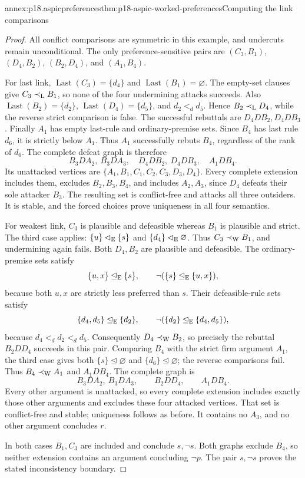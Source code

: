 \begin{annexitem}{annex:p18.aspicpreferences}{thm:p18-aspic-worked-preferences}{Computing the link comparisons}
\begin{proof}
All conflict comparisons are symmetric in this example, and undercuts
remain unconditional. The only preference-sensitive pairs are
\((C_3,B_1)\), \((D_4,B_2)\), \((B_2,D_4)\), and \((A_1,B_4)\).

For last link,
\(\operatorname{Last}(C_3)=\{d_4\}\) and
\(\operatorname{Last}(B_1)=\varnothing\).
The empty-set clauses give \(C_3\prec_{\rm L}B_1\), so none of the
four undermining attacks succeeds.
Also \(\operatorname{Last}(B_2)=\{d_2\}\),
\(\operatorname{Last}(D_4)=\{d_5\}\), and \(d_2<_d d_5\).
Hence \(B_2\prec_{\rm L}D_4\), while the reverse strict comparison
is false. The successful rebuttals are \(D_4 D B_2,D_4 D B_3\).
Finally \(A_1\) has empty last-rule and ordinary-premise sets.
Since \(B_4\) has last rule \(d_6\), it is strictly below \(A_1\).
Thus \(A_1\) successfully rebuts \(B_4\), regardless of the rank of \(d_6\).
The complete defeat graph is therefore
\[
 B_3D A_2,\ B_3D A_3,\quad
 D_4D B_2,\ D_4D B_3,\quad A_1D B_4 .
\]
Its unattacked vertices are
\(\{A_1,B_1,C_1,C_2,C_3,D_3,D_4\}\).
Every complete extension includes them, excludes \(B_2,B_3,B_4\),
and includes \(A_2,A_3\), since \(D_4\) defeats their sole attacker
\(B_3\). The resulting set is conflict-free and attacks all three
outsiders. It is stable, and the forced choices prove uniqueness in all
four semantics.

For weakest link, \(C_3\) is plausible and defeasible whereas \(B_1\)
is plausible and strict. The third case applies:
\(\{u\}\lhd_{\rm E}\{s\}\) and
\(\{d_4\}\lhd_{\rm E}\varnothing\).
Thus \(C_3\prec_{\rm W}B_1\), and undermining again fails.
Both \(D_4,B_2\) are plausible and defeasible.
The ordinary-premise sets satisfy
\[
 \{u,x\}\unlhd_{\rm E}\{s\},\qquad
 \neg(\{s\}\unlhd_{\rm E}\{u,x\}),
\]
because both \(u,x\) are strictly less preferred than \(s\).
Their defeasible-rule sets satisfy
\[
 \{d_4,d_5\}\unlhd_{\rm E}\{d_2\},\qquad
 \neg(\{d_2\}\unlhd_{\rm E}\{d_4,d_5\}),
\]
because \(d_4<_d d_2<_d d_5\).
Consequently \(D_4\prec_{\rm W}B_2\), so precisely the rebuttal
\(B_2 D D_4\) succeeds in this pair.
Comparing \(B_4\) with the strict firm argument \(A_1\), the third
case gives both \(\{s\}\unlhd\varnothing\) and
\(\{d_6\}\unlhd\varnothing\); the reverse comparisons fail.
Thus \(B_4\prec_{\rm W}A_1\) and \(A_1 D B_4\).
The complete graph is
\[
 B_3D A_2,\ B_3D A_3,\qquad B_2D D_4,\qquad A_1D B_4 .
\]
Every other argument is unattacked, so every complete extension includes
exactly those other arguments and excludes these four attacked vertices.
That set is conflict-free and stable; uniqueness follows as before.
It contains no \(A_3\), and no other argument concludes \(r\).

In both cases \(B_1,C_3\) are included and conclude \(s,\neg s\).
Both graphs exclude \(B_4\), so neither extension contains an argument
concluding \(\neg p\). The pair \(s,\neg s\) proves the stated
inconsistency boundary.
\end{proof}
\end{annexitem}

